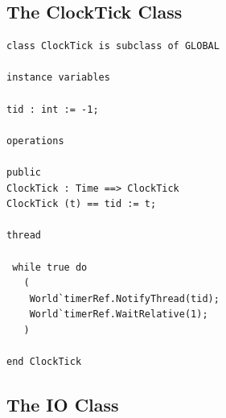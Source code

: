 \documentclass{overturerepchap}
\begin{document}
\subsection{The ClockTick Class}

\begin{lstlisting}
class ClockTick is subclass of GLOBAL

instance variables

tid : int := -1;

operations

public 
ClockTick : Time ==> ClockTick
ClockTick (t) == tid := t;

thread

 while true do
   (
    World`timerRef.NotifyThread(tid);
    World`timerRef.WaitRelative(1);
   )

end ClockTick
\end{lstlisting}

\subsection{The IO Class}
\end{document}
